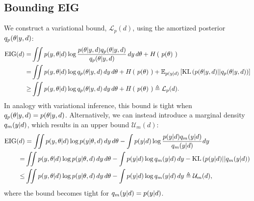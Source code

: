 \subsection{Bounding EIG}
\label{sec:bounds}
We construct a variational bound, $\mathcal{L}_p(d)$, using the amortized posterior $q_p(\theta | y,d)$:
\begin{align}
	\text{EIG}(d) =& \iint  p(y, \theta | d) \log \frac{p(\theta | y, d)q_{{p}}(\theta | y,d)}{q_p(\theta | y,d)} \, dy \, d\theta + H\left(\ p(\theta)\ \right)  \\
	\label{eq:postboundkl}
	=& \iint p(y, \theta | d) \log q_p(\theta | y, d)  \, dy\, d\theta+H\left(\ p(\theta)\ \right) + \mathbb{E}_{p(y|d)} \left[\text{KL}\left(p(\theta | y,d)||q_p(\theta | y, d)\right)\right]\\
	\label{eq:postbound}
	\ge& \iint p(y, \theta | d) \log q_p(\theta | y, d) \, dy\, d\theta+H\left(\ p(\theta)\ \right) \triangleq \mathcal{L}_p(d).
\end{align}
In analogy with variational inference, this bound is tight when $q_p(\theta | y, d) = p(\theta | y, d)$.
%
Alternatively, we can instead introduce a marginal density $q_m(y|d)$, which results in an upper bound $\mathcal{U}_m(d)$:
\begin{align}
	\text{EIG}(d)&= \iint p(y, \theta | d) \log p(y | \theta, d) \, dy\, d\theta-\int p(y|d) \log \frac{p(y|d)q_m(y|d)}{q_m(y|d)} dy
	\\
	=& \iint p(y, \theta | d) \log p(y | \theta, d) \, dy\, d\theta-\int p(y|d) \log q_m(y|d) \, dy
	-\text{KL}\left(p(y|d)||q_m(y|d)\right)\\
	\label{eq:margbound}
	\le& \iint p(y, \theta | d) \log p(y | \theta, d) \, dy\, d\theta-\int p(y|d) \log q_m(y|d) \, dy
	\triangleq \mathcal{U}_m(d),
\end{align}
where the bound becomes tight for $q_m(y|d)=p(y|d)$.

